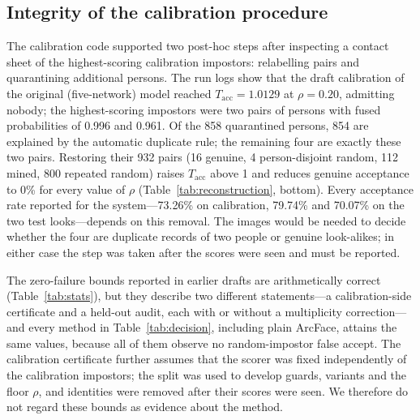 \documentclass[journal]{IEEEtran}
\begin{document}
\subsection{Integrity of the calibration procedure}
\label{sec:integrity}
The calibration code supported two post-hoc steps after inspecting a contact sheet of the highest-scoring calibration impostors: relabelling pairs and quarantining additional persons. The run logs show that the draft calibration of the original (five-network) model reached $T_\mathrm{acc}=1.0129$ at $\rho=0.20$, admitting nobody; the highest-scoring impostors were two pairs of persons with fused probabilities of 0.996 and 0.961. Of the 858 quarantined persons, 854 are explained by the automatic duplicate rule; the remaining four are exactly these two pairs. Restoring their 932 pairs (16 genuine, 4 person-disjoint random, 112 mined, 800 repeated random) raises $T_\mathrm{acc}$ above 1 and reduces genuine acceptance to 0\% for every value of $\rho$ (Table~\ref{tab:reconstruction}, bottom). Every acceptance rate reported for the system---73.26\% on calibration, 79.74\% and 70.07\% on the two test looks---depends on this removal. The images would be needed to decide whether the four are duplicate records of two people or genuine look-alikes; in either case the step was taken after the scores were seen and must be reported.

The zero-failure bounds reported in earlier drafts are arithmetically correct (Table~\ref{tab:stats}), but they describe two different statements---a calibration-side certificate and a held-out audit, each with or without a multiplicity correction---and every method in Table~\ref{tab:decision}, including plain ArcFace, attains the same values, because all of them observe no random-impostor false accept. The calibration certificate further assumes that the scorer was fixed independently of the calibration impostors; the split was used to develop guards, variants and the floor $\rho$, and identities were removed after their scores were seen. We therefore do not regard these bounds as evidence about the method.


\end{document}
